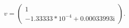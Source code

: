 \documentclass[preview]{standalone}
\begin{document}
\begin{center}
\raggedright
                \(v = \begin{pmatrix}
                                1 \\
                                -1.33333 * 10^{-4} + 0.00033993\mathrm{i}
                            \end{pmatrix}\).
\end{center}
\end{document}
